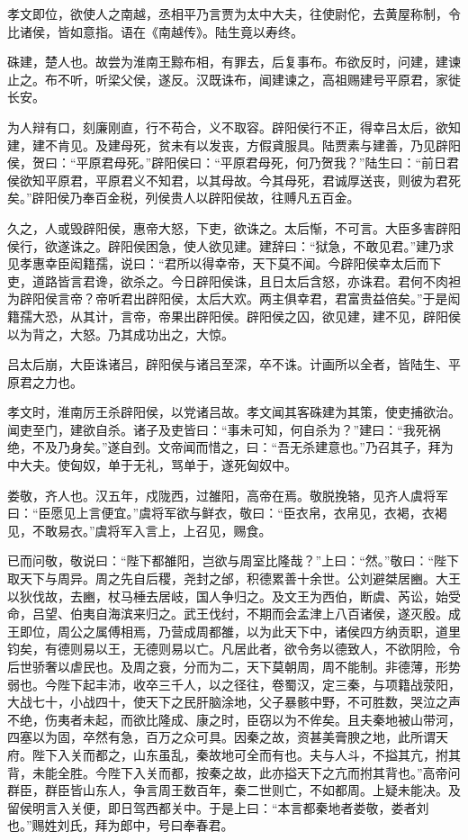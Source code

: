 \documentclass[12pt,UTF8]{ctexbook}
\begin{document}
孝文即位，欲使人之南越，丞相平乃言贾为太中大夫，往使尉佗，去黄屋称制，令比诸侯，皆如意指。语在《南越传》。陆生竟以寿终。



硃建，楚人也。故尝为淮南王黥布相，有罪去，后复事布。布欲反时，问建，建谏止之。布不听，听梁父侯，遂反。汉既诛布，闻建谏之，高祖赐建号平原君，家徙长安。



为人辩有口，刻廉刚直，行不苟合，义不取容。辟阳侯行不正，得幸吕太后，欲知建，建不肯见。及建母死，贫未有以发丧，方假貣服具。陆贾素与建善，乃见辟阳侯，贺曰：“平原君母死。”辟阳侯曰：“平原君母死，何乃贺我？”陆生曰：“前日君侯欲知平原君，平原君义不知君，以其母故。今其母死，君诚厚送丧，则彼为君死矣。”辟阳侯乃奉百金税，列侯贵人以辟阳侯故，往赙凡五百金。



久之，人或毁辟阳侯，惠帝大怒，下吏，欲诛之。太后惭，不可言。大臣多害辟阳侯行，欲遂诛之。辟阳侯困急，使人欲见建。建辞曰：“狱急，不敢见君。”建乃求见孝惠幸臣闳籍孺，说曰：“君所以得幸帝，天下莫不闻。今辟阳侯幸太后而下吏，道路皆言君谗，欲杀之。今日辟阳侯诛，且日太后含怒，亦诛君。君何不肉袒为辟阳侯言帝？帝听君出辟阳侯，太后大欢。两主俱幸君，君富贵益倍矣。”于是闳籍孺大恐，从其计，言帝，帝果出辟阳侯。辟阳侯之囚，欲见建，建不见，辟阳侯以为背之，大怒。乃其成功出之，大惊。



吕太后崩，大臣诛诸吕，辟阳侯与诸吕至深，卒不诛。计画所以全者，皆陆生、平原君之力也。



孝文时，淮南厉王杀辟阳侯，以党诸吕故。孝文闻其客硃建为其策，使吏捕欲治。闻吏至门，建欲自杀。诸子及吏皆曰：“事未可知，何自杀为？”建曰：“我死祸绝，不及乃身矣。”遂自刭。文帝闻而惜之，曰：“吾无杀建意也。”乃召其子，拜为中大夫。使匈奴，单于无礼，骂单于，遂死匈奴中。



娄敬，齐人也。汉五年，戍陇西，过雒阳，高帝在焉。敬脱挽辂，见齐人虞将军曰：“臣愿见上言便宜。”虞将军欲与鲜衣，敬曰：“臣衣帛，衣帛见，衣褐，衣褐见，不敢易衣。”虞将军入言上，上召见，赐食。



已而问敬，敬说曰：“陛下都雒阳，岂欲与周室比隆哉？”上曰：“然。”敬曰：“陛下取天下与周异。周之先自后稷，尧封之邰，积德累善十余世。公刘避桀居豳。大王以狄伐故，去豳，杖马棰去居岐，国人争归之。及文王为西伯，断虞、芮讼，始受命，吕望、伯夷自海滨来归之。武王伐纣，不期而会孟津上八百诸侯，遂灭殷。成王即位，周公之属傅相焉，乃营成周都雒，以为此天下中，诸侯四方纳贡职，道里钧矣，有德则易以王，无德则易以亡。凡居此者，欲令务以德致人，不欲阴险，令后世骄奢以虐民也。及周之衰，分而为二，天下莫朝周，周不能制。非德薄，形势弱也。今陛下起丰沛，收卒三千人，以之径往，卷蜀汉，定三秦，与项籍战荥阳，大战七十，小战四十，使天下之民肝脑涂地，父子暴骸中野，不可胜数，哭泣之声不绝，伤夷者未起，而欲比隆成、康之时，臣窃以为不侔矣。且夫秦地被山带河，四塞以为固，卒然有急，百万之众可具。因秦之故，资甚美膏腴之地，此所谓天府。陛下入关而都之，山东虽乱，秦故地可全而有也。夫与人斗，不搤其亢，拊其背，未能全胜。今陛下入关而都，按秦之故，此亦搤天下之亢而拊其背也。”高帝问群臣，群臣皆山东人，争言周王数百年，秦二世则亡，不如都周。上疑未能决。及留侯明言入关便，即日驾西都关中。于是上曰：“本言都秦地者娄敬，娄者刘也。”赐姓刘氏，拜为郎中，号曰奉春君。
\end{document}
